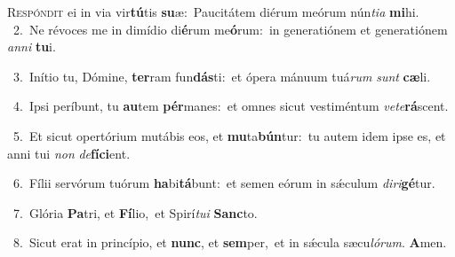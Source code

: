 \lettrine{\initial\textcolor{\initialcolor}{R}}{espóndit} ei in via vir\-\textbf{tú}\-tis \textbf{su}\-æ:~\star Paucitátem diérum meórum nún\-\textit{ti}\-\textit{a} \textbf{mi}\-hi.\\
{\numbfont\textcolor{\numbcolor}{~2.}}~Ne révoces me in dimídio di\-\textbf{é}\-rum me\-\textbf{ó}\-rum:~\star in generatiónem et generatiónem \textit{an}\-\textit{ni} \textbf{tu}\-i.\par
{\numbfont\textcolor{\numbcolor}{~3.}}~Inítio tu, Dómine, \textbf{ter}\-ram fun\-\textbf{dás}\-ti:~\star et ópera mánuum tuá\textit{rum} \textit{sunt} \textbf{cæ}\-li.\par
{\numbfont\textcolor{\numbcolor}{~4.}}~Ipsi períbunt, tu \textbf{au}\-tem \textbf{pér}\-manes:~\star et omnes sicut vestiméntum \textit{ve}\-\textit{te}\textbf{rá}scent.\par
{\numbfont\textcolor{\numbcolor}{~5.}}~Et sicut opertórium mutábis eos, et \textbf{mu}\-ta\-\textbf{bún}\-tur:~\star tu autem idem ipse es, et anni tui \textit{non} \textit{de}\-\textbf{fí}\textbf{ci}ent.\par
{\numbfont\textcolor{\numbcolor}{~6.}}~Fílii servórum tuórum \textbf{ha}\-bi\-\textbf{tá}\-bunt:~\star et semen eórum in sǽculum \textit{di}\-\textit{ri}\textbf{gé}tur.\par
{\numbfont\textcolor{\numbcolor}{~7.}}~Glória \textbf{Pa}\-tri, et \textbf{Fí}\-lio,~\star et Spirí\-\textit{tu}\-\textit{i} \textbf{Sanc}\-to.\par
{\numbfont\textcolor{\numbcolor}{~8.}}~Sicut erat in princípio, et \textbf{nunc}\-, et \textbf{sem}\-per,~\star et in sǽcula sæcu\-\textit{ló}\-\textit{rum}. \textbf{A}\-men.\par
